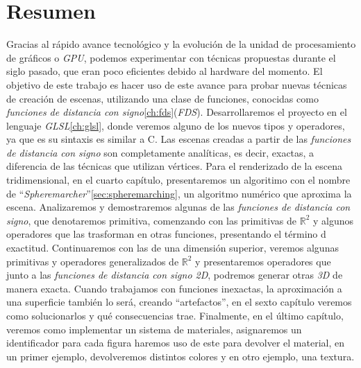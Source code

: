 \thispagestyle{empty}

\chapter*{Resumen}

Gracias al rápido avance tecnológico y la evolución de la unidad de procesamiento de gráficos o \textit{GPU}, podemos experimentar con técnicas propuestas durante el siglo pasado, que eran poco eficientes debido al hardware del momento. El objetivo de este trabajo es hacer uso de este avance para probar nuevas técnicas de creación de escenas, utilizando una clase de funciones, conocidas como \textit{funciones de distancia con signo}\ref{ch:fds}(\textit{FDS}). Desarrollaremos el proyecto en el lenguaje \textit{GLSL}\ref{ch:glsl}, donde veremos alguno de los nuevos tipos y operadores, ya que es su sintaxis es similar a C. Las escenas creadas a partir de las \textit{funciones de distancia con signo} son completamente analíticas, es decir, exactas, a diferencia de las técnicas que utilizan vértices. Para el renderizado de la escena tridimensional, en el cuarto capítulo, presentaremos un algoritimo con el nombre de \enquote{\textit{Spheremarcher}}\ref{sec:spheremarching}, un algoritmo numérico que aproxima la escena. Analizaremos y demostraremos algunas de las \textit{funciones de distancia con signo}, que denotaremos primitiva, comenzando con las primitivas de \(\mathbb{R}^2\) y algunos operadores que las trasforman en otras funciones, presentando el término d exactitud. Continuaremos con las de una dimensión superior, veremos algunas primitivas y operadores generalizados de \(\mathbb{R}^2\) y presentaremos operadores que junto a las \textit{funciones de distancia con signo 2D}, podremos generar otras \textit{3D} de manera exacta. Cuando trabajamos con funciones inexactas, la aproximación a una superficie también lo será, creando \enquote{artefactos}, en el sexto capítulo veremos como solucionarlos y qué consecuencias trae. Finalmente, en el último capítulo, veremos como implementar un sistema de materiales, asignaremos un identificador para cada figura haremos uso de este para devolver el material, en un primer ejemplo, devolveremos distintos colores y en otro ejemplo, una textura.

\vspace{0.7cm}


